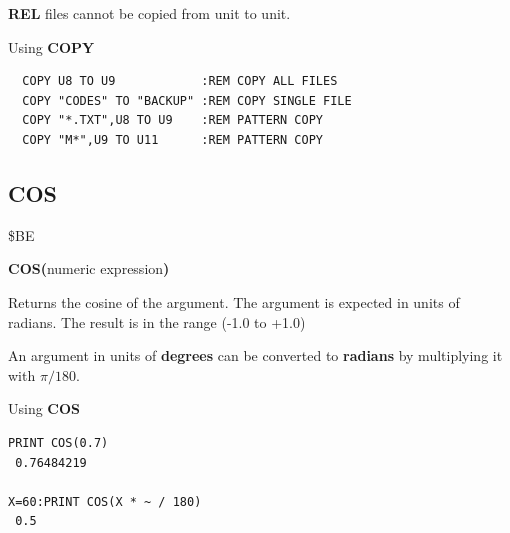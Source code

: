 \begin{description}[leftmargin=2cm,style=nextline]
   {\bf REL} files cannot be copied from unit to unit.

\item [Examples:] Using {\bf COPY}
\begin{tcolorbox}[colback=black,coltext=white]
\verbatimfont{\codefont}
\begin{verbatim}
  COPY U8 TO U9            :REM COPY ALL FILES
  COPY "CODES" TO "BACKUP" :REM COPY SINGLE FILE
  COPY "*.TXT",U8 TO U9    :REM PATTERN COPY
  COPY "M*",U9 TO U11      :REM PATTERN COPY
\end{verbatim}
\end{tcolorbox}
\end{description}


\newpage
\subsection{COS}
\begin{description}[leftmargin=2cm,style=nextline]
\item [Token:] \$BE
\item [Format:] {\bf COS(}numeric expression{\bf )}
\item [Usage:] Returns the cosine of the argument.
               The argument is expected in units of radians.
               The result is in the range (-1.0 to +1.0)

\item [Remarks:] An argument in units of {\bf degrees}
                 can be converted to {\bf radians}
                 by multiplying it with $\pi/180$.
\item [Examples:] Using {\bf COS}
\begin{tcolorbox}[colback=black,coltext=white]
\verbatimfont{\codefont}
\begin{verbatim}
PRINT COS(0.7)
 0.76484219

X=60:PRINT COS(X * ~ / 180)
 0.5
\end{verbatim}
\end{tcolorbox}
\end{description}


\newpage
